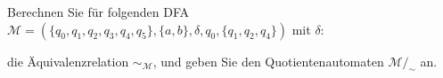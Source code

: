 \begin{exercise}
Berechnen Sie für folgenden DFA $\mathcal{M}=(\{q_0,q_1,q_2,q_3,q_4,q_5\},\{a,b\},\delta,q_0,\{q_1,q_2,q_4\})$ mit $\delta$:

\begin{center}
  
\end{center}
die Äquivalenzrelation
  $\sim_{\mathcal{M}}$, und geben Sie den Quotientenautomaten ${\mathcal{M}}/_\sim$ an.
\end{exercise}
